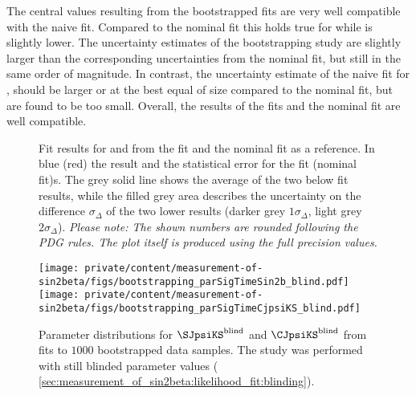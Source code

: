 The central values resulting from the bootstrapped \sPlot fits are very well
compatible with the naive \sPlot fit. Compared to the nominal fit this holds
true for \CJpsiKS while \SJpsiKS is slightly lower. The uncertainty estimates of
the bootstrapping study are slightly larger than the corresponding uncertainties
from the nominal fit, but still in the same order of magnitude. In contrast, the
uncertainty estimate of the naive \sPlot fit for \SJpsiKS, should be larger or
at the best equal of size compared to the nominal fit, but are found to be too
small. Overall, the results of the \sPlot fits and the nominal fit are well
compatible.
%
\begin{figure}
\centering


\caption{
Fit results for \SJpsiKS and \CJpsiKS from the \sPlot fit and the nominal fit as
a reference. In blue (red) the result and the statistical error for the \sPlot
fit (nominal fit)s. The grey solid line shows the average of the two below fit
results, while the filled grey area describes the uncertainty on the difference
$\sigma_\Delta$ of the two lower results (darker grey $1\sigma_\Delta$, light
grey $2\sigma_\Delta$).
\textit{Please note: The shown numbers are rounded following the PDG rules. The
plot itself is produced using the full precision values.}}
\label{fig:measurement_of_sin2beta:systematics:cross_checks:splot_fit:s_and_c}
\end{figure}
%
\begin{figure}
\centering
\texttt{[image: private/content/measurement-of-sin2beta/figs/bootstrapping\_parSigTimeSin2b\_blind.pdf]}
\hfill
\texttt{[image: private/content/measurement-of-sin2beta/figs/bootstrapping\_parSigTimeCjpsiKS\_blind.pdf]}
\caption{
Parameter distributions for $\SJpsiKS^{\text{blind}}$ and
$\CJpsiKS^{\text{blind}}$ from \sPlot fits to $\num{1000}$ bootstrapped data
samples. The study was performed with still blinded parameter values (\cf
\cref{sec:measurement_of_sin2beta:likelihood_fit:blinding}).}
\label{fig:measurement_of_sin2beta:systematics:cross_checks:splot_fit:bootstrapping}
\end{figure}

